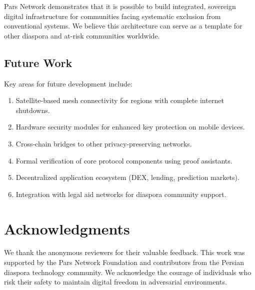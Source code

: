 \documentclass[11pt,a4paper,twocolumn]{article}
\begin{document}
Pars Network demonstrates that it is possible to build integrated, sovereign digital infrastructure for communities facing systematic exclusion from conventional systems. We believe this architecture can serve as a template for other diaspora and at-risk communities worldwide.

\subsection{Future Work}

Key areas for future development include:

\begin{enumerate}[leftmargin=*]
  \item Satellite-based mesh connectivity for regions with complete internet shutdowns.
  \item Hardware security modules for enhanced key protection on mobile devices.
  \item Cross-chain bridges to other privacy-preserving networks.
  \item Formal verification of core protocol components using proof assistants.
  \item Decentralized application ecosystem (DEX, lending, prediction markets).
  \item Integration with legal aid networks for diaspora community support.
\end{enumerate}

\section*{Acknowledgments}

We thank the anonymous reviewers for their valuable feedback. This work was supported by the Pars Network Foundation and contributors from the Persian diaspora technology community. We acknowledge the courage of individuals who risk their safety to maintain digital freedom in adversarial environments.
\end{document}
